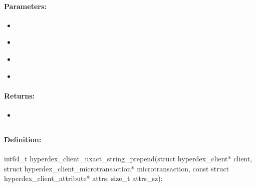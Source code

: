 \paragraph{Parameters:}
\begin{itemize}[noitemsep]
\item {}\\

\item {}\\

\item {}\\

\item {}\\

\end{itemize}

\paragraph{Returns:}
\begin{itemize}[noitemsep]
\item {}\\

\end{itemize}

\pagebreak
\subsection{}
\label{api:c:uxact_string_prepend}


\paragraph{Definition:}
\begin{ccode}
int64_t hyperdex_client_uxact_string_prepend(struct hyperdex_client* client,
        struct hyperdex_client_microtransaction* microtransaction,
        const struct hyperdex_client_attribute* attrs, size_t attrs_sz);
\end{ccode}

